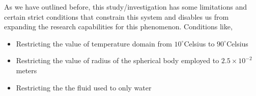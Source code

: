 {As we have outlined before, this study/investigation has some limitations and certain strict conditions that constrain this system and disables us from expanding the research capabilities for this phenomenon. Conditions like,}
        
    \begin{itemize}
        \item {Restricting the value of temperature domain from $10^\circ$Celsius to $90^\circ$Celsius}
        \item {Restricting the value of radius of the spherical body employed to $2.5\times10^{-2}$ meters}
        \item {Restricting the the fluid used to only water}
    \end{itemize}
        
        

